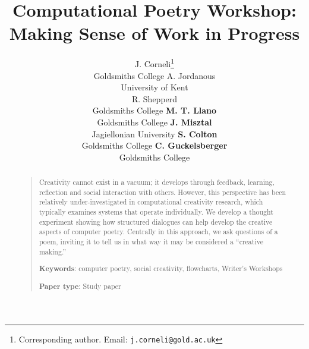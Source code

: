 \documentclass[letterpaper]{article}
\title{Computational Poetry Workshop: Making Sense of Work in Progress}
\author{J. Corneli\thanks{Corresponding author. Email: {\tt j.corneli@gold.ac.uk}} \\ Goldsmiths College
\And A. Jordanous \\ University of Kent \\
\And R. Shepperd \\ Goldsmiths College
\And \textbf{M. T. Llano}  \\ Goldsmiths College
\AND \textbf{J. Misztal}  \\ Jagiellonian University
\And \textbf{S. Colton}  \\ Goldsmiths College
\And \textbf{C. Guckelsberger}  \\ Goldsmiths College
}
\begin{document}
 
\maketitle
\begin{abstract}
\begin{quote}
Creativity cannot exist in a vacuum; it develops through feedback,
learning, reflection and social interaction with others. However, this perspective
has been relatively under-investigated in computational creativity
research, which typically examines systems that operate
individually. 
We develop a thought experiment showing how structured dialogues can help develop the
creative aspects of computer poetry.
Centrally in this approach, we ask questions of a poem, inviting it to tell us in what way it may be considered a ``creative making.''


\medskip

\textbf{Keywords}: computer poetry, social creativity, flowcharts, Writer's Workshops

\medskip

\textbf{Paper type}: Study paper
\end{quote}
\end{abstract}




\end{document}
